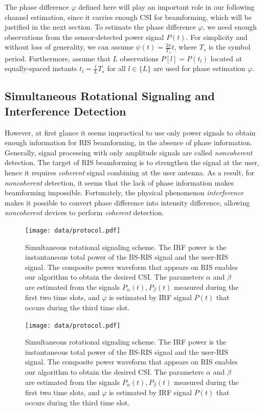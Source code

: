 \documentclass[journal,twocolumn]{IEEEtran}
\theoremstyle{nonumberplain}
\begin{document}
    The phase difference $\varphi$ defined here will play an important role in our following channel estimation, since it carries enough CSI for beamforming, which will be justified in the next section. To estimate the phase difference $\varphi$, we need enough observations from the sensor-detected power signal $P(t)$. For simplicity and without loss of generality, we can assume $\psi(t)=\frac{2\pi}{T_{s}} t$, where $T_s$ is the symbol period. Furthermore, assume that $L$ observations $P[l]=P(t_{l})$ located at equally-spaced instants $t_{l}=\frac{l}{L}T_{s}$ for all $l\in \{L\}$
    are used for phase estimation $\varphi$.

\subsection{Simultaneous Rotational Signaling and Interference Detection} \label{Simultaneous Rotational Signaling and Interference Detection}
    However, at first glance it seems impractical to use only power signals to obtain enough information for RIS beamforming, in the absence of phase information. 
    Generally, signal processing with only amplitude signals are called {\it noncoherent} detection. The target of RIS beamforming is to strengthen the signal at the user, hence it requires {\it coherent} signal combining at the user antenna.  
    As a result, for {\it noncoherent} detection, it seems that the lack of phase information makes beamforming impossible. 
    Fortunately, the physical phenomenon {\it interference} makes it possible to convert phase difference into intensity difference, allowing {\it noncoherent} devices to perform {\it coherent} detection. 
    \ifx\onecol\undefined
        \begin{figure}[!t]
            \centering
            \texttt{[image: data/protocol.pdf]}
            \caption{Simultaneous rotational signaling scheme. The IRF power is the instantaneous total power of the BS-RIS signal and the user-RIS signal. The composite power waveform that appears on RIS enables our algorithm to obtain the desired CSI. The parameters $\alpha$ and $\beta$ are estimated from the signals $P_{\alpha}(t), P_{\beta}(t)$ measured during the first two time slots, and $\varphi$ is estimated by IRF signal $P(t)$ that occurs during the third time slot.}
            \label{fig:protocol}
        \end{figure}
    \else 
        \begin{figure}[!t]
            \centering
            \texttt{[image: data/protocol.pdf]}
            \caption{Simultaneous rotational signaling scheme. The IRF power is the instantaneous total power of the BS-RIS signal and the user-RIS signal. The composite power waveform that appears on RIS enables our algorithm to obtain the desired CSI. The parameters $\alpha$ and $\beta$ are estimated from the signals $P_{\alpha}(t), P_{\beta}(t)$ measured during the first two time slots, and $\varphi$ is estimated by IRF signal $P(t)$ that occurs during the third time slot.}
            \label{fig:protocol}
        \end{figure}
    \fi
\end{document}
